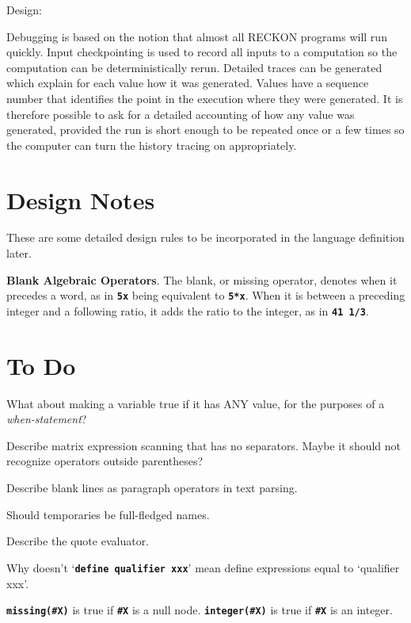 \documentclass[12pt]{article}
\newcommand{\TT}[1]{{\tt \bfseries #1}}
\newcommand{\EOL}{\penalty \exhyphenpenalty}
\begin{document}
Design:

Debugging is based on the notion that almost all
RECKON programs will run quickly.
Input checkpointing is used to record all inputs to a computation
so the computation can be deterministically rerun.  Detailed
traces can be generated which explain for each value how it was generated.
Values have a sequence number that identifies the point in the execution
where they were generated.  It is therefore possible to ask for a detailed
accounting of how any value was generated, provided the run is short enough
to be repeated once or a few times so the computer can turn the history
tracing on appropriately.

\section{Design Notes}

These are some detailed design rules to be incorporated in the language
definition later.

\begin{list}{}{}

\item
{\bf Blank Algebraic Operators}.
The blank, or missing operator, denotes \TT{*} when it precedes a word,
as in \TT{5x} being equivalent to \TT{5*x}.  When it is between a
preceding integer and a following ratio, it adds the ratio to the integer,
as in \TT{41 1/3}.

\end{list}

\section{To Do}

What about making a variable true if it has ANY value, for the
purposes of a {\em when-statement}?

Describe matrix expression scanning that has no separators.
Maybe it should not recognize operators outside parentheses?

Describe blank lines as paragraph operators in text parsing.

Should temporaries be full-fledged names.

Describe the quote evaluator.\label{QUOTE-EVALUATOR}

Why doesn't `\TT{define qualifier xxx}' mean define expressions equal
to `{qual\-i\-fier\EOL{} xxx}'.

\TT{missing(\#X)} is true if \TT{\#X} is a null node.
\TT{integer(\#X)} is true if \TT{\#X} is an integer.
\end{document}
